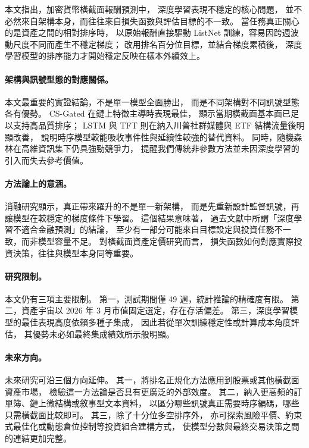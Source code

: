 
本文指出，加密貨幣橫截面報酬預測中，
深度學習表現不穩定的核心問題，
並不必然來自架構本身，而往往來自損失函數與評估目標的不一致。
當任務真正關心的是資產之間的相對排序時，
以原始報酬直接驅動 ListNet 訓練，容易因跨週波動尺度不同而產生不穩定梯度；
改用排名百分位目標，並結合梯度累積後，
深度學習模型的排序能力才開始穩定反映在樣本外績效上。

\paragraph{架構與訊號型態的對應關係。}
本文最重要的實證結論，不是單一模型全面勝出，
而是不同架構對不同訊號型態各有優勢。
CS-Gated 在鏈上特徵主導時表現最佳，
顯示當期橫截面基本面已足以支持高品質排序；
LSTM 與 TFT 則在納入川普社群媒體與 ETF 結構流量後明顯改善，
說明時序模型較能吸收事件性與延續性較強的替代資料。
同時，隨機森林在高維資訊集下仍具強勁競爭力，
提醒我們傳統非參數方法並未因深度學習的引入而失去參考價值。

\paragraph{方法論上的意涵。}
消融研究顯示，真正帶來躍升的不是單一新架構，
而是先重新設計監督訊號，再讓模型在較穩定的梯度條件下學習。
這個結果意味著，
過去文獻中所謂「深度學習不適合金融預測」的結論，
至少有一部分可能來自目標設定與投資任務不一致，而非模型容量不足。
對橫截面資產定價研究而言，
損失函數如何對應實際投資決策，往往與模型本身同等重要。

\paragraph{研究限制。}
本文仍有三項主要限制。
第一，測試期間僅 49 週，統計推論的精確度有限。
第二，資產宇宙以 2026 年 3 月市值固定選定，存在存活偏差。
第三，深度學習模型的最佳表現高度依賴多種子集成，
因此若從單次訓練穩定性或計算成本角度評估，
其優勢未必如最終集成績效所示般明顯。

\paragraph{未來方向。}
未來研究可沿三個方向延伸。
其一，將排名正規化方法應用到股票或其他橫截面資產市場，
檢驗這一方法論是否具有更廣泛的外部效度。
其二，納入更高頻的訂單簿、鏈上微結構或敘事型文本資料，
以區分哪些訊號真正需要時序編碼，哪些只需橫截面比較即可。
其三，除了十分位多空排序外，
亦可探索風險平價、約束式最佳化或動態倉位控制等投資組合建構方式，
使模型分數與最終交易決策之間的連結更加完整。
